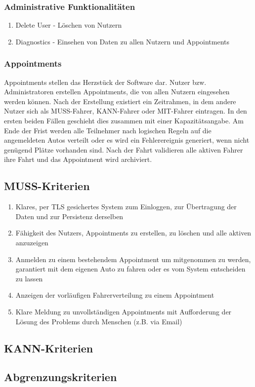 \documentclass[11pt,a4paper]{article}
\begin{document}
\subsubsection{Administrative Funktionalitäten}
\begin{enumerate}
\item Delete User - Löschen von Nutzern
\item Diagnostics - Einsehen von Daten zu allen Nutzern und Appointments
\end{enumerate}
\subsubsection{Appointments}
Appointments stellen das Herzstück der Software dar. Nutzer bzw. Administratoren erstellen Appointments, die von allen Nutzern eingesehen werden können. Nach der Erstellung existiert ein Zeitrahmen, in dem andere Nutzer sich als MUSS-Fahrer, KANN-Fahrer oder MIT-Fahrer eintragen. In den ersten beiden Fällen geschieht dies zusammen mit einer Kapazitätsangabe.
Am Ende der Frist werden alle Teilnehmer nach logischen Regeln auf die angemeldeten Autos verteilt oder es wird ein Fehlerereignis generiert, wenn nicht genügend Plätze vorhanden sind.
Nach der Fahrt validieren alle aktiven Fahrer ihre Fahrt und das Appointment wird archiviert.
\subsection{MUSS-Kriterien}
\begin{enumerate}
\item Klares, per TLS gesichertes System zum Einloggen, zur Übertragung der Daten und zur Persistenz derselben
\item Fähigkeit des Nutzers, Appointments zu erstellen, zu löschen und alle aktiven anzuzeigen
\item Anmelden zu einem bestehendem Appointment um mitgenommen zu werden, garantiert mit dem eigenen Auto zu fahren oder es vom System entscheiden zu lassen
\item Anzeigen der vorläufigen Fahrerverteilung zu einem Appointment
\item Klare Meldung zu unvollständigen Appointments mit Aufforderung der Lösung des Problems durch Menschen (z.B. via Email)
\end{enumerate}
\subsection{KANN-Kriterien}
\subsection{Abgrenzungskriterien}
\end{document}
